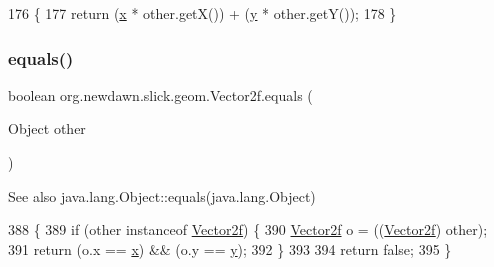 \begin{DoxyCode}
176                                      \{
177         \textcolor{keywordflow}{return} (\mbox{\hyperlink{classorg_1_1newdawn_1_1slick_1_1geom_1_1_vector2f_a3c72cdf13ebc511a472e1a02002fa579}{x}} * other.getX()) + (\mbox{\hyperlink{classorg_1_1newdawn_1_1slick_1_1geom_1_1_vector2f_aa03914f0c3d32063aa90e5bd7b74688e}{y}} * other.getY());
178     \}
\end{DoxyCode}
\mbox{\label{classorg_1_1newdawn_1_1slick_1_1geom_1_1_vector2f_a064d1ba4d71fc4ebf1d6fa8adca00784}} 
\subsubsection{\texorpdfstring{equals()}{equals()}}
{\footnotesize\ttfamily boolean org.\+newdawn.\+slick.\+geom.\+Vector2f.\+equals (\begin{DoxyParamCaption}\item[{Object}]{other }\end{DoxyParamCaption})\hspace{0.3cm}{\ttfamily [inline]}}

\begin{DoxySeeAlso}{See also}
java.\+lang.\+Object\+::equals(java.\+lang.\+Object) 
\end{DoxySeeAlso}

\begin{DoxyCode}
388                                         \{
389         \textcolor{keywordflow}{if} (other instanceof \mbox{\hyperlink{classorg_1_1newdawn_1_1slick_1_1geom_1_1_vector2f_a3b8e9eda9c9203462324bf4bc8e42153}{Vector2f}}) \{
390             \mbox{\hyperlink{classorg_1_1newdawn_1_1slick_1_1geom_1_1_vector2f_a3b8e9eda9c9203462324bf4bc8e42153}{Vector2f}} o = ((\mbox{\hyperlink{classorg_1_1newdawn_1_1slick_1_1geom_1_1_vector2f_a3b8e9eda9c9203462324bf4bc8e42153}{Vector2f}}) other);
391             \textcolor{keywordflow}{return} (o.x == \mbox{\hyperlink{classorg_1_1newdawn_1_1slick_1_1geom_1_1_vector2f_a3c72cdf13ebc511a472e1a02002fa579}{x}}) && (o.y == \mbox{\hyperlink{classorg_1_1newdawn_1_1slick_1_1geom_1_1_vector2f_aa03914f0c3d32063aa90e5bd7b74688e}{y}});
392         \}
393         
394         \textcolor{keywordflow}{return} \textcolor{keyword}{false};
395     \}
\end{DoxyCode}
\mbox{\label{classorg_1_1newdawn_1_1slick_1_1geom_1_1_vector2f_a46e844df14e38b24eafc60842bf50c66}} 
